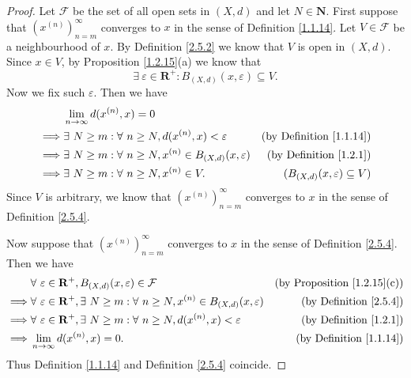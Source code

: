 \begin{proof}
    Let \(\mathcal{F}\) be the set of all open sets in \((X, d)\) and let \(N \in \mathbf{N}\).
    First suppose that \((x^{(n)})_{n = m}^\infty\) converges to \(x\) in the sense of Definition \ref{1.1.14}.
    Let \(V \in \mathcal{F}\) be a neighbourhood of \(x\).
    By Definition \ref{2.5.2} we know that \(V\) is open in \((X, d)\).
    Since \(x \in V\), by Proposition \ref{1.2.15}(a) we know that
    \[
        \exists\ \varepsilon \in \mathbf{R}^+ : B_{(X, d)}(x, \varepsilon) \subseteq V.
    \]
    Now we fix such \(\varepsilon\).
    Then we have
    \begin{align*}
                 & \lim_{n \to \infty} d(x^{(n)}, x) = 0                                                                                    \\
        \implies & \exists\ N \geq m : \forall\ n \geq N, d(x^{(n)}, x) < \varepsilon            & \text{(by Definition \ref{1.1.14})}      \\
        \implies & \exists\ N \geq m : \forall\ n \geq N, x^{(n)} \in B_{(X, d)}(x, \varepsilon) & \text{(by Definition \ref{1.2.1})}       \\
        \implies & \exists\ N \geq m : \forall\ n \geq N, x^{(n)} \in V.                         & (B_{(X, d)}(x, \varepsilon) \subseteq V)
    \end{align*}
    Since \(V\) is arbitrary, we know that \((x^{(n)})_{n = m}^\infty\) converges to \(x\) in the sense of Definition \ref{2.5.4}.

    Now suppose that \((x^{(n)})_{n = m}^\infty\) converges to \(x\) in the sense of Definition \ref{2.5.4}.
    Then we have
    \begin{align*}
                 & \forall\ \varepsilon \in \mathbf{R}^+, B_{(X, d)}(x, \varepsilon) \in \mathcal{F}                                    & \text{(by Proposition \ref{1.2.15}(c))} \\
        \implies & \forall\ \varepsilon \in \mathbf{R}^+, \exists\ N \geq m : \forall\ n \geq N, x^{(n)} \in B_{(X, d)}(x, \varepsilon) & \text{(by Definition \ref{2.5.4})}      \\
        \implies & \forall\ \varepsilon \in \mathbf{R}^+, \exists\ N \geq m : \forall\ n \geq N, d(x^{(n)}, x) < \varepsilon            & \text{(by Definition \ref{1.2.1})}      \\
        \implies & \lim_{n \to \infty} d(x^{(n)}, x) = 0.                                                                               & \text{(by Definition \ref{1.1.14})}
    \end{align*}
    Thus Definition \ref{1.1.14} and Definition \ref{2.5.4} coincide.
\end{proof}

